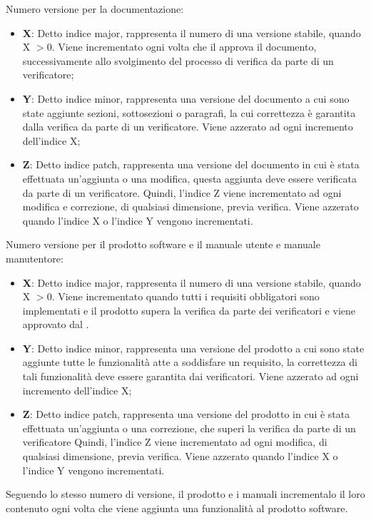 Numero versione per la documentazione:
\begin{itemize}
	\item \textbf{X}: Detto indice major, rappresenta il numero di una versione stabile, quando X $> 0$.
	Viene incrementato ogni volta che il \Responsabile{} approva il documento, successivamente allo svolgimento del processo di verifica da parte di un verificatore;
	\item \textbf{Y}: Detto indice minor, rappresenta una versione del documento a cui sono state aggiunte sezioni, sottosezioni o paragrafi, la cui correttezza è garantita dalla verifica da parte di un verificatore. 
	Viene azzerato ad ogni incremento dell'indice X;
	\item \textbf{Z}: Detto indice patch, rappresenta una versione del documento in cui è stata effettuata un'aggiunta o una modifica, questa aggiunta deve essere verificata da parte di un verificatore.
	Quindi, l'indice Z viene incrementato ad ogni modifica e correzione, di qualsiasi dimensione, previa verifica.
	Viene azzerato quando l'indice X o l'indice Y vengono incrementati.
\end{itemize}

Numero versione per il prodotto software e il manuale utente e manuale manutentore:
\begin{itemize}
	\item \textbf{X}: Detto indice major, rappresenta il numero di una versione stabile, quando X $> 0$.
	Viene incrementato quando tutti i requisiti obbligatori sono implementati e il prodotto supera la verifica da parte dei verificatori e viene approvato dal \Responsabile{}.
	\item \textbf{Y}: Detto indice minor, rappresenta una versione del prodotto a cui sono state aggiunte tutte le funzionalità atte a soddisfare un requisito, la correttezza di tali funzionalità deve essere garantita dai verificatori.  
	Viene azzerato ad ogni incremento dell'indice X;
	\item \textbf{Z}: Detto indice patch, rappresenta una versione del prodotto in cui è stata effettuata un'aggiunta o una correzione, che superi la verifica da parte di un verificatore
	Quindi, l'indice Z viene incrementato ad ogni modifica, di qualsiasi dimensione, previa verifica.
	Viene azzerato quando l'indice X o l'indice Y vengono incrementati.
\end{itemize}
Seguendo lo stesso numero di versione, il prodotto e i manuali incrementalo il loro contenuto ogni volta che viene aggiunta una funzionalità al prodotto software.

